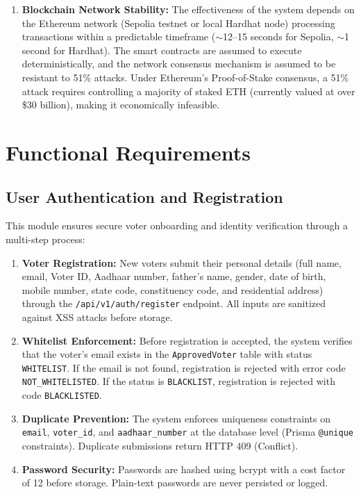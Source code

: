 \documentclass[oneside,a4paper,12pt]{book}
\begin{document}
\begin{enumerate}[leftmargin=1.5cm]
    \item \textbf{Blockchain Network Stability:} The effectiveness of the system depends on the Ethereum network (Sepolia testnet or local Hardhat node) processing transactions within a predictable timeframe ($\sim$12--15 seconds for Sepolia, $\sim$1 second for Hardhat). The smart contracts are assumed to execute deterministically, and the network consensus mechanism is assumed to be resistant to 51\% attacks. Under Ethereum's Proof-of-Stake consensus, a 51\% attack requires controlling a majority of staked ETH (currently valued at over \$30 billion), making it economically infeasible.
\end{enumerate}

\section{Functional Requirements}

\subsection{User Authentication and Registration}
This module ensures secure voter onboarding and identity verification through a multi-step process:
\begin{enumerate}[label=\alph*., leftmargin=1.5cm]
    \item \textbf{Voter Registration:} New voters submit their personal details (full name, email, Voter ID, Aadhaar number, father's name, gender, date of birth, mobile number, state code, constituency code, and residential address) through the \texttt{/api/v1/auth/register} endpoint. All inputs are sanitized against XSS attacks before storage.

    \item \textbf{Whitelist Enforcement:} Before registration is accepted, the system verifies that the voter's email exists in the \texttt{ApprovedVoter} table with status \texttt{WHITELIST}. If the email is not found, registration is rejected with error code \texttt{NOT\_WHITELISTED}. If the status is \texttt{BLACKLIST}, registration is rejected with code \texttt{BLACKLISTED}.

    \item \textbf{Duplicate Prevention:} The system enforces uniqueness constraints on \texttt{email}, \texttt{voter\_id}, and \texttt{aadhaar\_number} at the database level (Prisma \texttt{@unique} constraints). Duplicate submissions return HTTP 409 (Conflict).

    \item \textbf{Password Security:} Passwords are hashed using bcrypt with a cost factor of 12 before storage. Plain-text passwords are never persisted or logged.
\end{enumerate}
\end{document}
